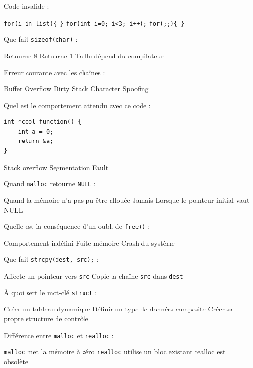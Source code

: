 \documentclass[12pt]{exam}
\begin{document}
\begin{questions}
\question Code invalide :
\begin{checkboxes}
 \CorrectChoice \texttt{for(i in list)\{ \}}
 \choice \texttt{for(int i=0; i<3; i++);}
 \choice \texttt{for(;;)\{ \}}
\end{checkboxes}

\pagebreak{}
\question Que fait \texttt{sizeof(char)} :
\begin{checkboxes}
 \choice Retourne 8
 \CorrectChoice Retourne 1
 \choice Taille dépend du compilateur
\end{checkboxes}

\question Erreur courante avec les chaînes :
\begin{checkboxes}
 \CorrectChoice Buffer Overflow
 \choice Dirty Stack
 \choice Character Spoofing
\end{checkboxes}

\question Quel est le comportement attendu avec ce code :
\begin{verbatim}
int *cool_function() {
    int a = 0;
    return &a;
}
\end{verbatim}
\begin{checkboxes}
 \choice Stack overflow
 \CorrectChoice Segmentation Fault
\end{checkboxes}

\question Quand \texttt{malloc} retourne \texttt{NULL} :
\begin{checkboxes}
 \CorrectChoice Quand la mémoire n’a pas pu être allouée
 \choice Jamais
 \choice Lorsque le pointeur initial vaut NULL
\end{checkboxes}

\question Quelle est la conséquence d’un oubli de \texttt{free()} :
\begin{checkboxes}
 \choice Comportement indéfini
 \CorrectChoice Fuite mémoire
 \choice Crash du système
\end{checkboxes}

\question Que fait \texttt{strcpy(dest, src);} :
\begin{checkboxes}
 \choice Affecte un pointeur vers \texttt{src}
 \CorrectChoice Copie la chaîne \texttt{src} dans \texttt{dest}
\end{checkboxes}

\question À quoi sert le mot-clé \texttt{struct} :
\begin{checkboxes}
 \choice Créer un tableau dynamique
 \CorrectChoice Définir un type de données composite
 \choice Créer sa propre structure de contrôle
\end{checkboxes}

\question Différence entre \texttt{malloc} et \texttt{realloc} :
\begin{checkboxes}
 \choice \texttt{malloc} met la mémoire à zéro
 \CorrectChoice \texttt{realloc} utilise un bloc existant
 \choice realloc est obsolète
\end{checkboxes}

\end{questions}
\end{document}
